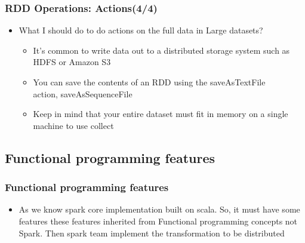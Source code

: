 \begin{frame}
  \frametitle{RDD Operations: Actions(4/4)}
 	\begin{itemize}[<+->]
		\item What I should do to do actions on the full data in Large datasets? 
		\begin{itemize}
			\item It’s common to write data out to a distributed storage system such as HDFS or Amazon S3
			\item You can save the contents of an RDD using the saveAsTextFile\(\) \\ action, saveAsSequenceFile\(\)
			\item Keep in mind that your entire dataset must fit in memory on a single machine to use collect\(\)
		\end{itemize}
	\end{itemize}
\end{frame}





%
%
%

\subsection{Functional programming features}
\begin{frame}
  \frametitle{Functional programming features}
 	\begin{itemize}[<+->]
		\item As we know spark core implementation built on scala. So, it must have some features these features inherited from Functional programming concepts not Spark. Then spark team implement the transformation to be distributed
	\end{itemize}
\end{frame}

%
%
%

